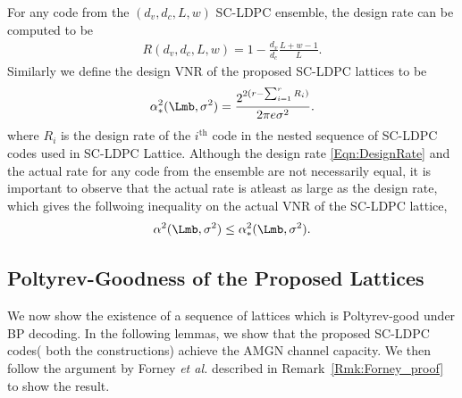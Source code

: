 \documentclass[journal]{IEEEtran}
\begin{document}
\begin{Discussion}
For any code from the $(d_{v},d_{c},L,w)$ SC-LDPC ensemble, the design rate can be computed to be 
\begin{align}
R(d_{v},d_{c},L,w)=1-\frac{d_{v}}{d_{c}}\frac{L+w-1}{L}.
\label{Eqn:DesignRate}
\end{align}
Similarly we define the design VNR of the proposed SC-LDPC lattices to be 
\begin{align*}
\alpha^{2}_{*}(\Lmb,\sigma^{2})=\frac{2^{2(r-\sum_{i=1}^{r}R_{i})}}{2\pi e\sigma^{2}}.
\end{align*}
where $R_{i}$ is the design rate of the $i^{\text{th}}$ code in the nested sequence of SC-LDPC codes used in SC-LDPC Lattice. Although the design rate \eqref{Eqn:DesignRate} and the actual rate for any code from the ensemble are not necessarily equal, it is important to observe that the actual rate is atleast as large as the design rate, which gives the follwoing inequality on the actual VNR of the SC-LDPC lattice,
\begin{align}
\alpha^{2}(\Lmb,\sigma^{2})\leq \alpha^{2}_{*}(\Lmb,\sigma^{2}).
\label{Eqn:VNRInequality}
\end{align}
\end{Discussion}


\subsection{Poltyrev-Goodness of the Proposed Lattices}
We now show the existence of a sequence of lattices which is Poltyrev-good under BP decoding. In the following lemmas, we show that the proposed SC-LDPC codes( both the constructions) achieve the AMGN channel capacity. We then follow the argument by Forney \textit{et al.} described in Remark~\ref{Rmk:Forney_proof} to show the result.
\end{document}
